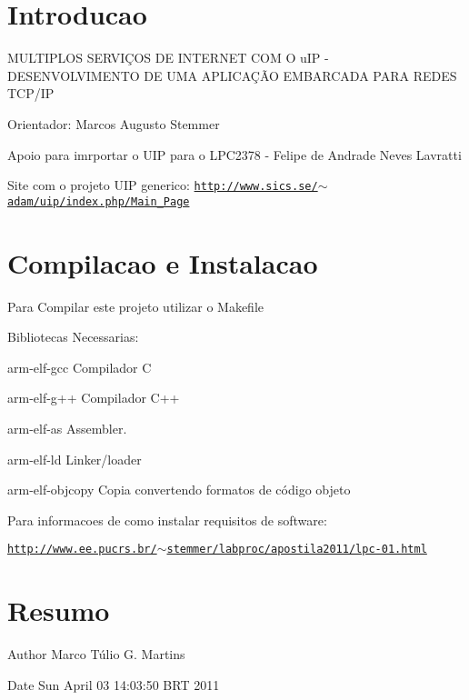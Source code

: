 \hypertarget{index_sec_intro}{}\section{Introducao}\label{index_sec_intro}
MULTIPLOS SERVIÇOS DE INTERNET COM O uIP -\/ DESENVOLVIMENTO DE UMA APLICAÇÃO EMBARCADA PARA REDES TCP/IP

Orientador: Marcos Augusto Stemmer

Apoio para imrportar o UIP para o LPC2378 -\/ Felipe de Andrade Neves Lavratti

Site com o projeto UIP generico: \href{http://www.sics.se/~adam/uip/index.php/Main_Page}{\tt http://www.sics.se/$\sim$adam/uip/index.php/Main\_\-Page}\hypertarget{index_sec_install}{}\section{Compilacao e Instalacao}\label{index_sec_install}
Para Compilar este projeto utilizar o Makefile

Bibliotecas Necessarias:

arm-\/elf-\/gcc Compilador C

arm-\/elf-\/g++ Compilador C++

arm-\/elf-\/as Assembler.

arm-\/elf-\/ld Linker/loader

arm-\/elf-\/objcopy Copia convertendo formatos de código objeto

Para informacoes de como instalar requisitos de software:

\href{http://www.ee.pucrs.br/~stemmer/labproc/apostila2011/lpc-01.html}{\tt http://www.ee.pucrs.br/$\sim$stemmer/labproc/apostila2011/lpc-\/01.html}\hypertarget{index_sec_summary}{}\section{Resumo}\label{index_sec_summary}
\begin{DoxyAuthor}{Author}
Marco Túlio G. Martins
\end{DoxyAuthor}
\begin{DoxyDate}{Date}
Sun April 03 14:03:50 BRT 2011 
\end{DoxyDate}

